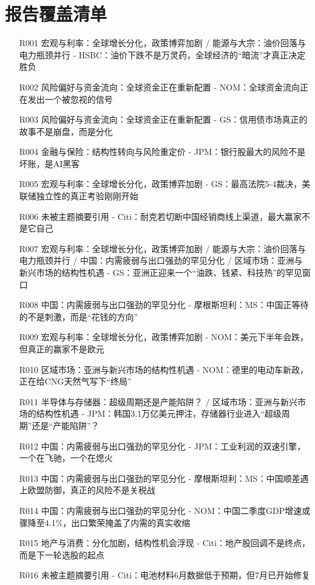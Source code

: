 \documentclass[11pt]{ctexart}
\begin{document}
\section{报告覆盖清单}
\begin{itemize}
  \item [R001] 宏观与利率：全球增长分化，政策博弈加剧 / 能源与大宗：油价回落与电力瓶颈并行 - HSBC：油价下跌不是万灵药，全球经济的“暗流”才真正决定胜负
  \item [R002] 风险偏好与资金流向：全球资金正在重新配置 - NOM：全球资金流向正在发出一个被忽视的信号
  \item [R003] 风险偏好与资金流向：全球资金正在重新配置 - GS：信用债市场真正的故事不是崩盘，而是分化
  \item [R004] 金融与保险：结构性转向与风险重定价 - JPM：银行股最大的风险不是坏账，是AI黑客
  \item [R005] 宏观与利率：全球增长分化，政策博弈加剧 - GS：最高法院5-4裁决，美联储独立性的真正考验刚刚开始
  \item [R006] 未被主题摘要引用 - Citi：耐克若切断中国经销商线上渠道，最大赢家不是它自己
  \item [R007] 宏观与利率：全球增长分化，政策博弈加剧 / 能源与大宗：油价回落与电力瓶颈并行 / 中国：内需疲弱与出口强劲的罕见分化 / 区域市场：亚洲与新兴市场的结构性机遇 - GS：亚洲正迎来一个“油跌、钱紧、科技热”的罕见窗口
  \item [R008] 中国：内需疲弱与出口强劲的罕见分化 - 摩根斯坦利：MS：中国正等待的不是刺激，而是“花钱的方向”
  \item [R009] 宏观与利率：全球增长分化，政策博弈加剧 - NOM：美元下半年会跌，但真正的赢家不是欧元
  \item [R010] 区域市场：亚洲与新兴市场的结构性机遇 - NOM：德里的电动车新政，正在给CNG天然气写下“终局”
  \item [R011] 半导体与存储器：超级周期还是产能陷阱？ / 区域市场：亚洲与新兴市场的结构性机遇 - JPM：韩国3.1万亿美元押注，存储器行业进入“超级周期”还是“产能陷阱”？
  \item [R012] 中国：内需疲弱与出口强劲的罕见分化 - JPM：工业利润的双速引擎，一个在飞驰，一个在熄火
  \item [R013] 中国：内需疲弱与出口强劲的罕见分化 - 摩根斯坦利：MS：中国顺差遇上欧盟防御，真正的风险不是关税战
  \item [R014] 中国：内需疲弱与出口强劲的罕见分化 - NOM：中国二季度GDP增速或骤降至4.1\%，出口繁荣掩盖了内需的真实收缩
  \item [R015] 地产与消费：分化加剧，结构性机会浮现 - Citi：地产股回调不是终点，而是下一轮选股的起点
  \item [R016] 未被主题摘要引用 - Citi：电池材料6月数据低于预期，但7月已开始修复

\end{itemize}
\end{document}

